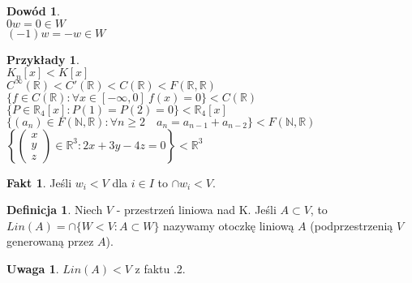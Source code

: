 \documentclass[12pt,a4paper]{article}
\newcommand{\RR}{\mathbb{R}}
\theoremstyle{plain}
\theoremstyle{definition}
\newtheorem{ft}{Fakt}[section]
\theoremstyle{definition}
\newtheorem{df}{Definicja}[section]
\theoremstyle{definition}
\theoremstyle{definition}
\newtheorem*{dd}{Dowód}
\theoremstyle{definition}
\theoremstyle{definition}
\newtheorem*{przy}{Przykłady}
\theoremstyle{definition}
\newtheorem*{uw}{Uwaga}
\theoremstyle{definition}
\begin{document}
\begin{dd} 
    ~\\
    $ 0w = 0 \in W$ \\
    $(-1)w = -w \in W$
\end{dd}
\newpage
\begin{przy}
    ~\\
    $K_n[x] < K[x]$ \\ 
    $C^\infty(\RR) < C'(\RR) < C(\RR) < F(\RR,\RR)$ \\
    $\{f \in C(\RR) : \forall x \in [-\infty,0] \ f(x) = 0\} < C(\RR)$ \\
    $\{P \in \RR_4[x] : P(1) = P(2) = 0\} < \RR_4[x]$ \\
    $\{(a_n) \in F(\mathbb{N},\RR) : \forall n \geqslant 2 \quad a_n = a_{n-1} + a_{n-2} \} < F(\mathbb{N},\RR)$ \\
    $\left\{ 
        \begin{pmatrix}
            x \\ 
            y \\ 
            z 
        \end{pmatrix}
        \in \RR^3 : 2x + 3y - 4z = 0
        \right\} < \RR^3
    $
\end{przy}
\begin{ft}
    Jeśli $w_i < V $ dla $i \in I$ to $\cap w_i < V$.
\end{ft}

\begin{df} 
    Niech $V$ - przestrzeń liniowa nad K. Jeśli $A \subset V$, to \\
    $Lin(A) = \cap \{W < V: A \subset W \}$ nazywamy otoczkę liniową $A$ (podprzestrzenią $V$ generowaną przez $A$).
\end{df}
\begin{uw}
    $Lin(A) < V $ z faktu \thesection.2.
\end{uw}
\end{document}
